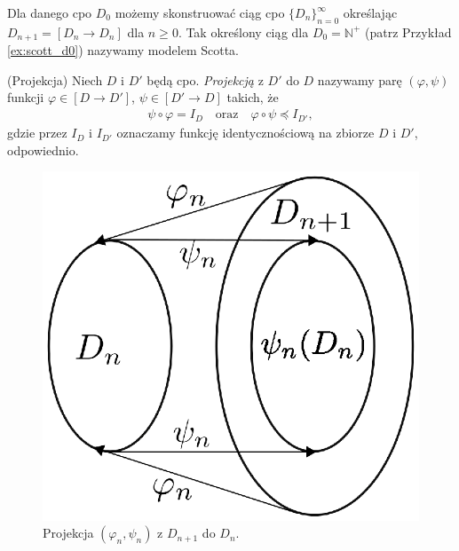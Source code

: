 \begin{dowod}
\begin{enumerate}
      \end{enumerate}
\end{dowod}
  \begin{definicja}\label{thm:scott_seq}
    Dla danego cpo \(D_0\) możemy skonstruować ciąg cpo \(\{D_n\}_{n=0}^{\infty}\) określając \(D_{n+1}=[D_n\to D_n]\) dla \(n\geq 0\). Tak określony ciąg dla \(D_0=\mathbb{N}^{+}\) (patrz Przykład \ref{ex:scott_d0}) nazywamy modelem Scotta.
  \end{definicja}
\begin{definicja}(Projekcja) %
Niech \(D\) i \(D'\) będą cpo. \emph{Projekcją} z \(D'\) do \(D\) nazywamy parę \((\varphi, \psi)\) funkcji \(\varphi \in [D\to D']\), \(\psi \in [D'\to D]\) takich, że
\begin{align}
\psi\circ \varphi = I_D\quad \text{oraz}\quad \varphi\circ \psi \preceq I_{D'}, %
\end{align}
gdzie przez \(I_D\) i \(I_{D'}\) oznaczamy funkcję identycznościową na zbiorze \(D\) i \(D'\), odpowiednio.
\end{definicja}

\begin{figure}[h]
  \centering
\includegraphics[width=0.37\linewidth]{../embeding_i}
  \caption{Projekcja \((\varphi_n,\psi_n)\) z \(D_{n+1}\) do \(D_n\).}\label{fig:projection}
\end{figure}

